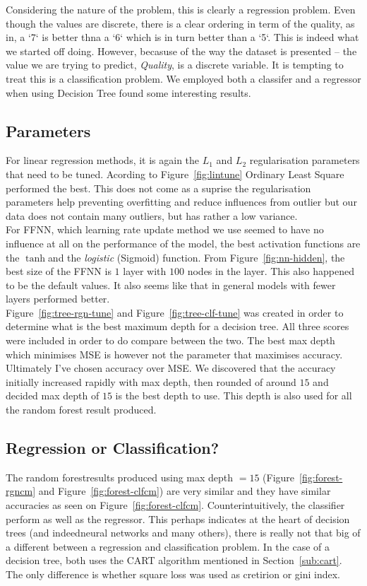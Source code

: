 \documentclass[english,notitlepage,reprint,nofootinbib]{revtex4-1}
\begin{document}
Considering the nature of the problem, this is clearly a regression problem. Even though the values are discrete, there is a clear ordering in term of the quality, as in, a `7` is better thna a `6` which is in turn better than a `5`. This is indeed what we started off doing. However, becasuse of the way the dataset is presented -- the value we are trying to predict, \textit{Quality}, is a discrete variable. It is tempting to treat this is a classification problem. We employed both a classifer and a regressor when using Decision Tree found some interesting results.


\subsection{Parameters}
For linear regression methods, it is again the $ L_1 $ and $ L_2 $ regularisation parameters that need to be tuned. Acording to Figure~\ref{fig:lintune} Ordinary Least Square performed the best. This does not come as a suprise the regularisation parameters help preventing overfitting and reduce influences from outlier but our data does not contain many outliers, but has rather a low variance.  \\
For FFNN, which learning rate update method we use seemed to have no influence at all on the performance of the model, the best activation functions are the $ \tanh $and the \textit{logistic} (Sigmoid) function. From Figure~\ref{fig:nn-hidden}, the best size of the FFNN is $ 1 $ layer with $ 100 $ nodes in the layer. This also happened to be the default values. It also seems like that in general models with fewer layers performed better. \\
Figure~\ref{fig:tree-rgn-tune} and Figure~\ref{fig:tree-clf-tune} was created in order to determine what is the best maximum depth for a decision tree. All three scores were included in order to do compare between the two. The best max depth which minimises MSE is however not the parameter that maximises accuracy. Ultimately I've chosen accuracy over MSE. We discovered that the accuracy initially increased rapidly with max depth, then rounded of around $ 15 $ and decided max depth of $ 15 $ is the best depth to use. This depth is also used for all the random forest result produced.


\subsection{Regression or Classification?}
The random forestresults produced using max depth $ =15 $ (Figure~\ref{fig:forest-rgncm} and
Figure~\ref{fig:forest-clfcm}) are very similar and they have similar accuracies as seen on Figure~\ref{fig:forest-clfcm}. Counterintuitively, the classifier perform as well as the regressor. This perhaps indicates at the heart of decision trees (and indeedneural networks and many others), there is really not that big of a different between a regression and classification problem. In the case of a decision tree, both uses the CART algorithm mentioned in Section~\ref{sub:cart}. The only difference is whether square loss was used as cretirion or gini index. 
\end{document}
